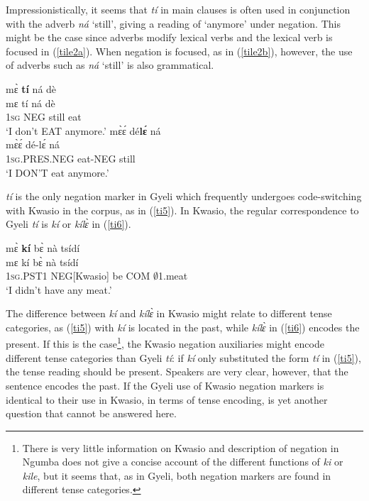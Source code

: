 Impressionistically, it seems that {\itshape tí} in main clauses is often used in conjunction with the adverb {\itshape ná} `still', giving a reading of `anymore' under negation. This might be the case since adverbs modify lexical verbs and the lexical verb is focused in (\ref{tile2a}). When negation is focused, as in (\ref{tile2b}), however, the use of adverbs such as {\itshape ná} `still' is also grammatical.

\begin{exe}
\ex\label{tile2}
\begin{xlist}
\ex\label{tile2a}
  \glll  mɛ̀ {\bfseries tí} ná dè \\
         mɛ tí ná dè \\
           1\textsc{sg} NEG still eat   \\
    \trans `I don't EAT anymore.'
\ex \label{tile2b}
  \glll  mɛ̀ɛ́ dé{\bfseries lɛ́} ná \\
        mɛ̀ɛ́ dé-lɛ́ ná \\
         1\textsc{sg}.PRES.NEG eat-NEG still   \\
    \trans `I DON'T eat anymore.'
\end{xlist}
\end{exe}


{\itshape tí} is the only negation marker in Gyeli which frequently undergoes code-switching with Kwasio in the corpus, as in (\ref{ti5}). In Kwasio, the regular correspondence to Gyeli {\itshape tí} is {\itshape kí} or {\itshape kílɛ̀} in (\ref{ti6}).

\begin{exe} 
\ex\label{ti5}
  \glll mɛ̀ {\bfseries kí} bɛ̀ nà tsídí \\
       mɛ kí bɛ̀ nà tsídí \\
       1\textsc{sg}.PST1 NEG[Kwasio] be COM $\emptyset$1.meat  \\
    \trans `I didn't have any meat.'
\end{exe}

\noindent The difference between {\itshape kí} and {\itshape kílɛ̀} in Kwasio might relate to different tense categories, as (\ref{ti5}) with {\itshape kí} is located in the past, while {\itshape kílɛ̀} in (\ref{ti6}) encodes the present. If this is the case\footnote{There is very little information on Kwasio and  description of negation in Ngumba does not give a concise account of the different functions of {\itshape ki} or {\itshape kile}, but it seems that, as in Gyeli, both negation markers are found in different tense categories.}, the Kwasio negation auxiliaries might encode different tense categories than Gyeli {\itshape tí}: if {\itshape kí} only substituted the form {\itshape tí} in (\ref{ti5}), the tense reading should be present. Speakers are very clear, however, that the sentence encodes the past. If the Gyeli use of Kwasio negation markers is identical to their use in Kwasio, in terms of tense encoding, is yet another question that cannot be answered here.

